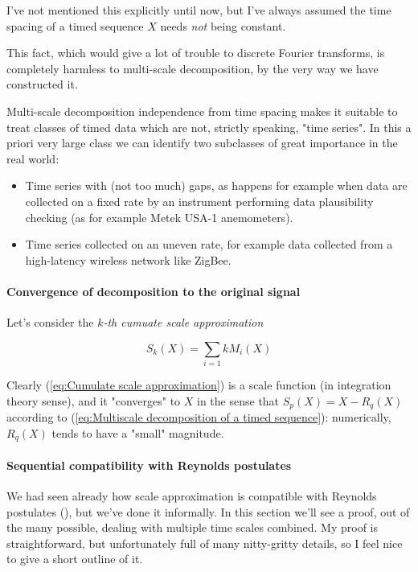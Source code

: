 \documentclass[a4paper,10pt]{book}
\begin{document}
I've not mentioned this explicitly until now, but I've always assumed the time spacing of a timed sequence $X$ needs \emph{not} being constant.

This fact, which would give a lot of trouble to discrete Fourier transforms, is completely harmless to multi-scale decomposition, by the very way we have constructed it.

Multi-scale decomposition independence from time spacing makes it suitable to treat classes of timed data which are not, strictly speaking, "time series". In this a priori very large class we can identify two subclasses of great importance in the real world:

\begin{itemize}
\item Time series with (not too much) gaps, as happens for example when data are collected on a fixed rate by an instrument performing data plausibility checking (as for example Metek USA-1 anemometers).
\item Time series collected on an uneven rate, for example data collected from a high-latency wireless network like ZigBee.
\end{itemize}


\paragraph{Convergence of decomposition to the original signal}

Let's consider the \emph{$k$-th cumuate scale approximation}

\begin{equation}\label{eq:Cumulate scale approximation}
	S_{k}(X) = \sum_{i=1}{k} M_{i}(X)
\end{equation}

Clearly (\ref{eq:Cumulate scale approximation}) is a scale function (in integration theory sense), and it "converges" to $X$ in the sense that $S_{p}(X) = X - R_{q}(X)$ according to (\ref{eq:Multiscale decomposition of a timed sequence}): numerically, $R_{q}(X)$ tends to have a "small" magnitude.


\paragraph{Sequential compatibility with Reynolds postulates}

We had seen already how scale approximation is compatible with Reynolds postulates (\cite{Stull1988}), but we've done it informally. In this section we'll see a proof, out of the many possible, dealing with multiple time scales combined. My proof is straightforward, but unfortunately full of many nitty-gritty details, so I feel nice to give a short outline of it.
\end{document}
